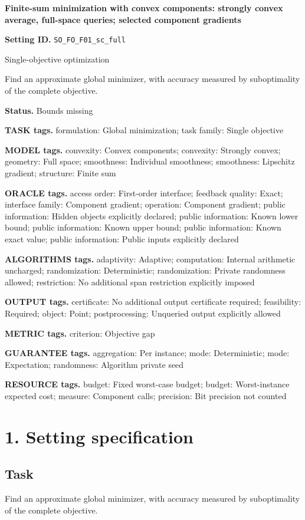 \documentclass[10pt,a4paper]{article}
\begin{document}
\raggedright

{\LARGE\bfseries\sffamily\color{AtlasNavy} Finite-sum minimization with convex components: strongly convex average, full-space queries; selected component gradients\par}\vspace{5pt}
\textbf{Setting ID.} \texttt{SO\_\allowbreak{}FO\_\allowbreak{}F01\_\allowbreak{}sc\_\allowbreak{}full}

Single-objective optimization

Find an approximate global minimizer, with accuracy measured by suboptimality of the complete objective.

\textbf{Status.} Bounds missing

\textbf{TASK tags.} formulation: Global minimization; task family: Single objective

\textbf{MODEL tags.} convexity: Convex components; convexity: Strongly convex; geometry: Full space; smoothness: Individual smoothness; smoothness: Lipschitz gradient; structure: Finite sum

\textbf{ORACLE tags.} access order: First-order interface; feedback quality: Exact; interface family: Component gradient; operation: Component gradient; public information: Hidden objects explicitly declared; public information: Known lower bound; public information: Known upper bound; public information: Known exact value; public information: Public inputs explicitly declared

\textbf{ALGORITHMS tags.} adaptivity: Adaptive; computation: Internal arithmetic uncharged; randomization: Deterministic; randomization: Private randomness allowed; restriction: No additional span restriction explicitly imposed

\textbf{OUTPUT tags.} certificate: No additional output certificate required; feasibility: Required; object: Point; postprocessing: Unqueried output explicitly allowed

\textbf{METRIC tags.} criterion: Objective gap

\textbf{GUARANTEE tags.} aggregation: Per instance; mode: Deterministic; mode: Expectation; randomness: Algorithm private seed

\textbf{RESOURCE tags.} budget: Fixed worst-case budget; budget: Worst-instance expected cost; measure: Component calls; precision: Bit precision not counted

\section{1. Setting specification}
\subsection{Task}
Find an approximate global minimizer, with accuracy measured by suboptimality of the complete objective.
\end{document}
